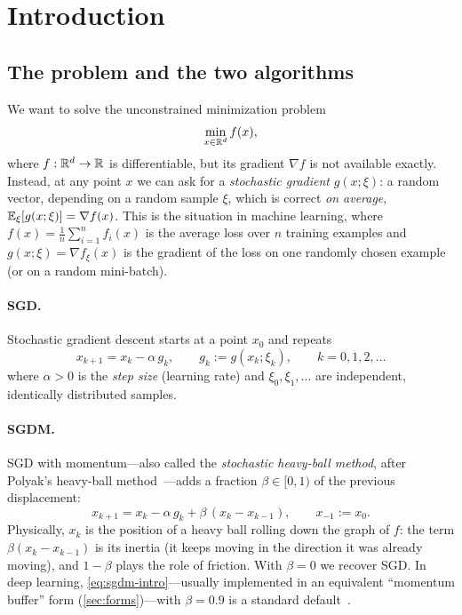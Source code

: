 \section{Introduction}\label{sec:intro}

\subsection{The problem and the two algorithms}

We want to solve the unconstrained minimization problem
\begin{equation}\label{eq:problem}
  \min_{x\in\mathbb{R}^d} f(x),
\end{equation}
where $f:\mathbb{R}^d\to\mathbb{R}$ is differentiable, but its gradient $\nabla f$ is not available
exactly. Instead, at any point $x$ we can ask for a \emph{stochastic gradient}
$g(x;\xi)$: a random vector, depending on a random sample $\xi$, which is correct
\emph{on average}, $\mathbb{E}_\xi[g(x;\xi)]=\nabla f(x)$. This is the situation in machine
learning, where $f(x)=\frac1n\sum_{i=1}^n f_i(x)$ is the average loss over $n$ training
examples and $g(x;\xi)=\nabla f_\xi(x)$ is the gradient of the loss on one randomly chosen
example (or on a random mini-batch).

\paragraph{SGD.} Stochastic gradient descent starts at a point $x_0$ and repeats
\begin{equation}\label{eq:sgd}
  x_{k+1}=x_k-\alpha\, g_k,\qquad g_k:=g(x_k;\xi_k),\qquad k=0,1,2,\dots
\end{equation}
where $\alpha>0$ is the \emph{step size} (learning rate) and $\xi_0,\xi_1,\dots$ are
independent, identically distributed samples.

\paragraph{SGDM.} SGD with momentum---also called the \emph{stochastic heavy-ball
method}, after Polyak's heavy-ball method~\cite{polyak1964}---adds a fraction
$\beta\in[0,1)$ of the previous displacement:
\begin{equation}\label{eq:sgdm-intro}
  x_{k+1}=x_k-\alpha\, g_k+\beta\,(x_k-x_{k-1}),\qquad x_{-1}:=x_0 .
\end{equation}
Physically, $x_k$ is the position of a heavy ball rolling down the graph of $f$: the term
$\beta(x_k-x_{k-1})$ is its inertia (it keeps moving in the direction it was already
moving), and $1-\beta$ plays the role of friction. With $\beta=0$ we recover SGD. In deep
learning, \eqref{eq:sgdm-intro}---usually implemented in an equivalent ``momentum buffer''
form (\cref{sec:forms})---with $\beta=0.9$ is a standard default~\cite{sutskever2013}.

